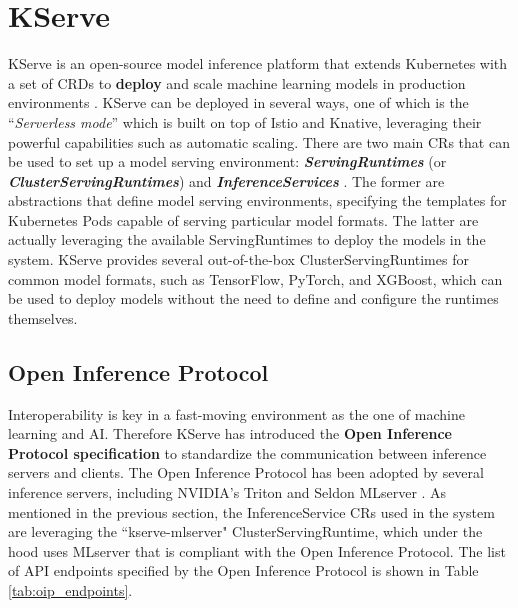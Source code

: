 
\section{KServe}
\label{sec:kserve}

KServe is an open-source model inference platform that extends Kubernetes with a set of CRDs to \textbf{deploy} and scale machine learning models in production environments \cite{kserve_docs}.
KServe can be deployed in several ways, one of which is the ``\textit{Serverless mode}'' which is built on top of Istio and Knative, leveraging their powerful capabilities such as automatic scaling. 
There are two main CRs that can be used to set up a model serving environment: \textit{\textbf{ServingRuntimes}} (or \textit{\textbf{ClusterServingRuntimes}}) and \textit{\textbf{InferenceServices}} \cite{krateo_docs}.
The former are abstractions that define model serving environments, specifying the templates for Kubernetes Pods capable of serving particular model formats. 
The latter are actually leveraging the available ServingRuntimes to deploy the models in the system.  
KServe provides several out-of-the-box ClusterServingRuntimes for common model formats, such as TensorFlow, PyTorch, and XGBoost, which can be used to deploy models without the need to define and configure the runtimes themselves.

\subsection{Open Inference Protocol}

Interoperability is key in a fast-moving environment as the one of machine learning and AI. 
Therefore KServe has introduced the \textbf{Open Inference Protocol specification} to standardize the communication between inference servers and clients. 
The Open Inference Protocol has been adopted by several inference servers, including NVIDIA's Triton and Seldon MLserver \cite{kserve_oip}.
As mentioned in the previous section, the InferenceService CRs used in the system are leveraging the ``kserve-mlserver" ClusterServingRuntime, which under the hood uses MLserver that is compliant with the Open Inference Protocol.
The list of API endpoints specified by the Open Inference Protocol is shown in Table \ref{tab:oip_endpoints}.

